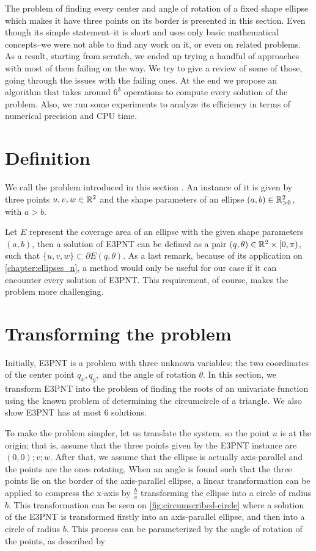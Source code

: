 The problem of finding every center and angle of rotation of a fixed shape ellipse which makes it have three points on its border is presented in this section. Even though its simple statement--it is short and uses only basic mathematical concepts--we were not able to find any work on it, or even on related problems. 
As a result, starting from scratch, we ended up trying a handful of approaches with most of them failing on the way. We try to give a review of some of those, going through the issues with the failing ones. At the end we propose an algorithm that takes around $6^3$ operations to compute every solution of the problem. Also, we run some experiments to analyze its efficiency in terms of numerical precision and CPU time.

\section{Definition}

We call the problem introduced in this section . An instance of it is given by three points $u, v, w \in \mathbb{R}^2$ and the shape parameters of an ellipse $(a, b) \in \mathbb{R}^2_{>0}$, with $a > b$. 

Let $E$ represent the coverage area of an ellipse with the given shape parameters $(a, b)$, then a solution of E3PNT can be defined as a pair $(q, \theta) \in \mathbb{R}^2\times[0, \pi)$, such that $\{u, v, w\} \subset \partial E(q, \theta)$. As a last remark, because of its application on \autoref{chapter:ellipses_n}, a method would only be useful for our case if it can encounter every solution of E3PNT. This requirement, of course, makes the problem more challenging.

\section{Transforming the problem}

Initially, E3PNT is a problem with three unknown variables: the two coordinates of the center point $q_x, q_y, $ and the angle of rotation $\theta$. In this section, we transform E3PNT into the problem of finding the roots of an univariate function using the known problem of determining the circumcircle of a triangle. We also show E3PNT has at most $6$ solutions.

To make the problem simpler, let us translate the system, so the point $u$ is at the origin; that is, assume that the three points given by the E3PNT instance are $(0, 0); v; w$. After that, we assume that the ellipse is actually axis-parallel and the points are the ones rotating. When an angle is found such that the three points lie on the border of the axis-parallel ellipse, a linear transformation can be applied to compress the x-axis by $\frac{b}{a}$ transforming the ellipse into a circle of radius $b$. This transformation can be seen on \autoref{fig:circumscribed-circle} where a solution of the E3PNT is transformed firstly into an axis-parallel ellipse, and then into a circle of radius $b$.
This process can be parameterized by the angle of rotation of the points, as described by

